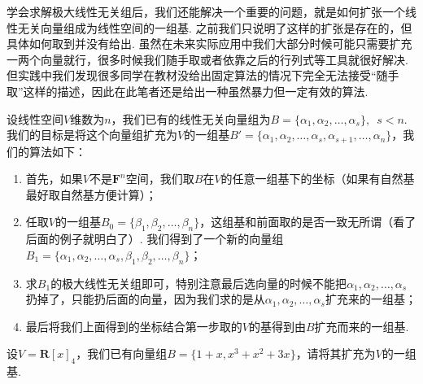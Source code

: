 学会求解极大线性无关组后，我们还能解决一个重要的问题，就是如何扩张一个线性无关向量组成为线性空间的一组基. 之前我们只说明了这样的扩张是存在的，但具体如何取到并没有给出. 虽然在未来实际应用中我们大部分时候可能只需要扩充一两个向量就行，很多时候我们随手取或者依靠之后的行列式等工具就很好解决. 但实践中我们发现很多同学在教材没给出固定算法的情况下完全无法接受``随手取''这样的描述，因此在此笔者还是给出一种虽然暴力但一定有效的算法.

设线性空间$V$维数为$n$，我们已有的线性无关向量组为$B=\{\alpha_1,\alpha_2,\ldots,\alpha_s\},\enspace s<n$. 我们的目标是将这个向量组扩充为$V$的一组基$B'=\{\alpha_1,\alpha_2,\ldots,\alpha_s,\alpha_{s+1},\ldots,\alpha_n\}$，我们的算法如下：
\begin{enumerate}
    \item 首先，如果$V$不是$\mathbf{F}^n$空间，我们取$B$在$V$的任意一组基下的坐标（如果有自然基最好取自然基方便计算）；

    \item 任取$V$的一组基$B_0=\{\beta_1,\beta_2,\ldots,\beta_n\}$，这组基和前面取的是否一致无所谓（看了后面的例子就明白了）. 我们得到了一个新的向量组$B_1=\{\alpha_1,\alpha_2,\ldots,\alpha_s,\beta_1,\beta_2,\ldots,\beta_n\}$；

    \item 求$B_1$的极大线性无关组即可，特别注意最后选向量的时候不能把$\alpha_1,\alpha_2,\ldots,\alpha_s$扔掉了，只能扔后面的向量，因为我们求的是从$\alpha_1,\alpha_2,\ldots,\alpha_s$扩充来的一组基；

    \item 最后将我们上面得到的坐标结合第一步取的$V$的基得到由$B$扩充而来的一组基.
\end{enumerate}

\begin{example}{}{}
    设$V=\mathbf{R}[x]_4$，我们已有向量组$B=\{1+x,x^3+x^2+3x\}$，请将其扩充为$V$的一组基.
\end{example}

